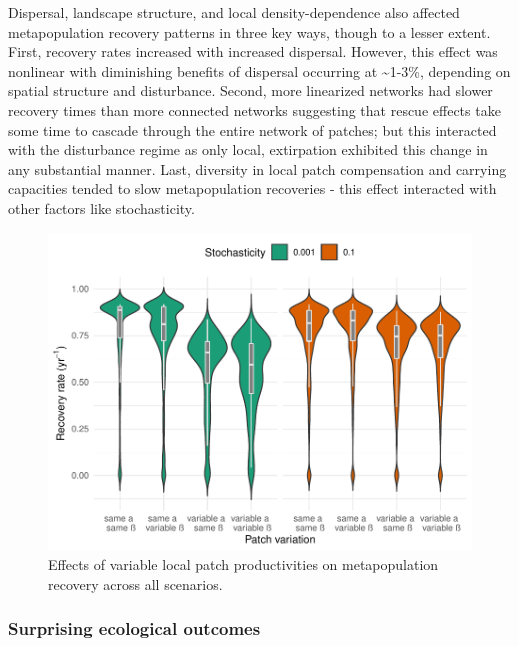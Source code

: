 \documentclass[
]{article}
\begin{document}
Dispersal, landscape structure, and local density-dependence also
affected metapopulation recovery patterns in three key ways, though to a
lesser extent. First, recovery rates increased with increased dispersal.
However, this effect was nonlinear with diminishing benefits of
dispersal occurring at \textasciitilde1-3\%, depending on spatial
structure and disturbance. Second, more linearized networks had slower
recovery times than more connected networks suggesting that rescue
effects take some time to cascade through the entire network of patches;
but this interacted with the disturbance regime as only local,
extirpation exhibited this change in any substantial manner. Last,
diversity in local patch compensation and carrying capacities tended to
slow metapopulation recoveries - this effect interacted with other
factors like stochasticity.

\begin{figure}[H]

{\centering \includegraphics{Managing_for_ecological_surprises_in_metapopulations_files/figure-latex/recovery with patch variation-1} 

}

\caption{Effects of variable local patch productivities on metapopulation recovery across all scenarios.}\label{fig:recovery with patch variation}
\end{figure}
\newpage

\hypertarget{surprising-ecological-outcomes}{%
\subsubsection{Surprising ecological
outcomes}\label{surprising-ecological-outcomes}}
\end{document}
